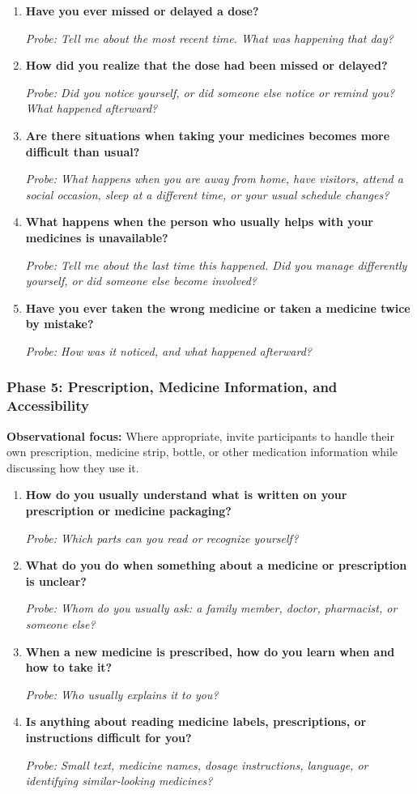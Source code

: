 \begin{enumerate}[resume]
  \item \textbf{Have you ever missed or delayed a dose?}

  \textit{Probe: Tell me about the most recent time. What was happening that day?}
  \item \textbf{How did you realize that the dose had been missed or delayed?}

  \textit{Probe: Did you notice yourself, or did someone else notice or remind you? What happened afterward?}
  \item \textbf{Are there situations when taking your medicines becomes more difficult than usual?}

  \textit{Probe: What happens when you are away from home, have visitors, attend a social occasion, sleep at a different time, or your usual schedule changes?}
  \item \textbf{What happens when the person who usually helps with your medicines is unavailable?}

  \textit{Probe: Tell me about the last time this happened. Did you manage differently yourself, or did someone else become involved?}
  \item \textbf{Have you ever taken the wrong medicine or taken a medicine twice by mistake?}

  \textit{Probe: How was it noticed, and what happened afterward?}
\end{enumerate}

\subsubsection{Phase 5: Prescription, Medicine Information, and Accessibility}

\textbf{Observational focus:} Where appropriate, invite participants to handle their own prescription, medicine strip, bottle, or other medication information while discussing how they use it.

\begin{enumerate}[resume]
  \item \textbf{How do you usually understand what is written on your prescription or medicine packaging?}

  \textit{Probe: Which parts can you read or recognize yourself?}
  \item \textbf{What do you do when something about a medicine or prescription is unclear?}

  \textit{Probe: Whom do you usually ask: a family member, doctor, pharmacist, or someone else?}
  \item \textbf{When a new medicine is prescribed, how do you learn when and how to take it?}

  \textit{Probe: Who usually explains it to you?}
  \item \textbf{Is anything about reading medicine labels, prescriptions, or instructions difficult for you?}

  \textit{Probe: Small text, medicine names, dosage instructions, language, or identifying similar-looking medicines?}
\end{enumerate}

